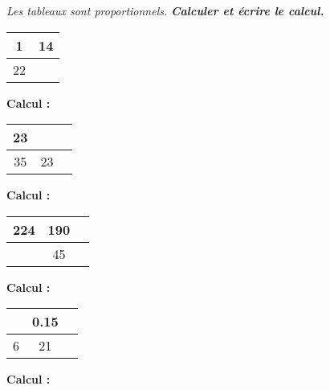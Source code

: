 \documentclass[12pt]{article}
\begin{document}
\textit{Les tableaux sont proportionnels.} \textit{\textbf{Calculer et écrire le calcul.}}

\begin{multicols}{4}

\begin{center}
    \begin{tabular}{|c|c|}
      \hline
      1 & 14  \\  \hline
      22 & \phantom{$\dfrac{\dfrac{123456789}{1}}{1}$}  \\  \hline
    \end{tabular}

    \vspace{0.5cm}
    \textbf{Calcul :}\dotfill 
  \end{center}

  \begin{center}
    \begin{tabular}{|c|c|c|}
      \hline
      23 & \phantom{$\dfrac{\dfrac{123456789}{1}}{1}$} \\  \hline
      35 & 23 \\  \hline
    \end{tabular}

    \vspace{0.5cm}
    \textbf{Calcul :}\dotfill 
  \end{center}

  \begin{center}
    \begin{tabular}{|c|c|c|}
      \hline
      224 & 190 \\  \hline
      \phantom{$\dfrac{\dfrac{123456789}{1}}{1}$} & 45 \\  \hline
    \end{tabular}
    
    \vspace{0.5cm}
    \textbf{Calcul :}\dotfill 
  \end{center}

  \begin{center}
    \begin{tabular}{|c|c|c|}
      \hline
      \phantom{$\dfrac{\dfrac{123456789}{1}}{1}$} & 0.15 \\  \hline
      6 & 21 \\  \hline
    \end{tabular}
    
    \vspace{0.5cm}
    \textbf{Calcul :}\dotfill 
  \end{center}

\end{multicols}
\end{document}

